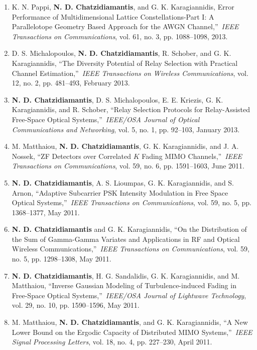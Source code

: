 \documentclass[11pt]{article}
\begin{document}
\begin{enumerate}
\item K. N. Pappi, \textbf{N. D. Chatzidiamantis}, and G. K. Karagiannidis, Error
Performance of Multidimensional Lattice Constellations-Part I: A Parallelotope Geometry Based Approach for the AWGN
Channel,\textquotedblright\ \emph{IEEE Transactions on Communications}, vol. 61, no. 3, pp. 1088--1098, 2013.

\item D. S. Michalopoulos, \textbf{N. D. Chatzidiamantis}, R. Schober, and G. K. Karagiannidis,
\textquotedblleft The Diversity Potential of Relay Selection with Practical Channel
Estimation,\textquotedblright\ \emph{IEEE Transactions on Wireless Communications}, vol. 12, no. 2, pp. 481--493,
February 2013.

\item \textbf{N. D. Chatzidiamantis}, D. S. Michalopoulos, E. E. Kriezis, G. K. Karagiannidis, and R. Schober,
\textquotedblleft Relay Selection Protocols for Relay-Assisted Free-Space Optical
Systems,\textquotedblright\ \emph{IEEE/OSA Journal of Optical Communications and Networking}, vol. 5, no. 1, pp.
92--103, January 2013.

\item M. Matthaiou, \textbf{N. D. Chatzidiamantis}, G. K. Karagiannidis, and J. A. Nossek,
\textquotedblleft ZF Detectors over Correlated $K$ Fading MIMO Channels,\textquotedblright\
\emph{IEEE Transactions on Communications}, vol. 59, no. 6, pp. 1591--1603, June 2011.

\item \textbf{N. D. Chatzidiamantis}, A. S. Lioumpas, G. K. Karagiannidis, and S. Arnon,
\textquotedblleft Adaptive Subcarrier PSK Intensity Modulation in Free Space Optical
Systems,\textquotedblright\ \emph{IEEE Transactions on Communications}, vol. 59, no. 5, pp. 1368--1377, May 2011.

\item \textbf{N. D. Chatzidiamantis} and G. K. Karagiannidis, \textquotedblleft On the Distribution of the
Sum of Gamma-Gamma Variates and Applications in RF and Optical Wireless Communications,\textquotedblright\
\emph{IEEE Transactions on Communications}, vol. 59, no. 5, pp. 1298--1308, May 2011.

\item \textbf{N. D. Chatzidiamantis}, H. G. Sandalidis, G. K. Karagiannidis, and M. Matthaiou,
\textquotedblleft Inverse Gaussian Modeling of Turbulence-induced Fading in Free-Space Optical
Systems,\textquotedblright\ \emph{IEEE/OSA Journal of Lightwave Technology}, vol. 29, no. 10, pp. 1590--1596, May
2011.
\item M. Matthaiou, \textbf{N. D. Chatzidiamantis}, and G. K. Karagiannidis, \textquotedblleft A New Lower
Bound on the Ergodic Capacity of Distributed MIMO Systems,\textquotedblright\ \emph{IEEE Signal Processing
Letters}, vol. 18, no. 4, pp. 227--230, April 2011.


\end{enumerate}
\end{document}
